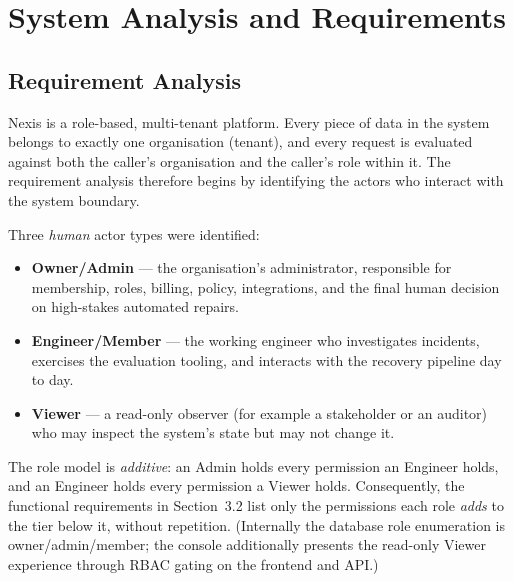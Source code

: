\chapter{System Analysis and Requirements}

\section{Requirement Analysis}

Nexis is a role-based, multi-tenant platform. Every piece of data in the
system belongs to exactly one organisation (tenant), and every request is
evaluated against both the caller's organisation and the caller's role within
it. The requirement analysis therefore begins by identifying the actors who
interact with the system boundary.

Three \emph{human} actor types were identified:

\begin{itemize}[nosep]
  \item \textbf{Owner/Admin} --- the organisation's administrator, responsible
        for membership, roles, billing, policy, integrations, and the final
        human decision on high-stakes automated repairs.
  \item \textbf{Engineer/Member} --- the working engineer who investigates
        incidents, exercises the evaluation tooling, and interacts with the
        recovery pipeline day to day.
  \item \textbf{Viewer} --- a read-only observer (for example a stakeholder or
        an auditor) who may inspect the system's state but may not change it.
\end{itemize}

The role model is \emph{additive}: an Admin holds every permission an Engineer
holds, and an Engineer holds every permission a Viewer holds. Consequently,
the functional requirements in Section~3.2 list only the permissions each role
\emph{adds} to the tier below it, without repetition. (Internally the database
role enumeration is owner/admin/member; the console additionally presents the
read-only Viewer experience through RBAC gating on the frontend and API.)


